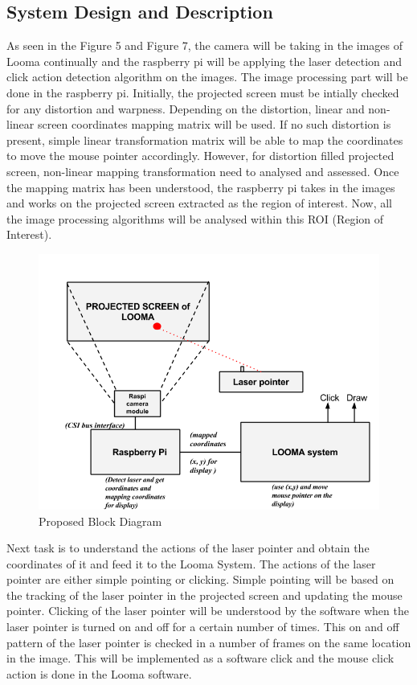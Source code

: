 \documentclass[12pt, a4paper]{article}
\begin{document}
\subsection{System Design and Description}
As seen in the Figure 5 and Figure 7, the camera will be taking in the images of Looma continually and the raspberry pi will be applying the laser detection and click action detection algorithm on the images. The image processing part will be done in the raspberry pi. Initially, the projected screen must be intially checked for any distortion and warpness. Depending on the distortion, linear and non-linear screen coordinates mapping matrix will be used. If no such distortion is present, simple linear transformation matrix will be able to map the coordinates to move the mouse pointer accordingly. However, for distortion filled projected screen, non-linear mapping transformation need to analysed and assessed. Once the mapping matrix has been understood, the raspberry pi takes in the images and works on the projected screen extracted as the region of interest. Now, all the image processing algorithms will be analysed within this ROI (Region of Interest).

\begin{figure}[htp]
\includegraphics[scale=0.5]{proposed_system}
\caption{Proposed Block Diagram}
\label{Proposed Block Diagram}
\end{figure}

Next task is to understand the actions of the laser pointer and obtain the coordinates of it and feed it to the Looma System. The actions of the laser pointer are either simple pointing or clicking. Simple pointing will be based on the tracking of the laser pointer in the projected screen and updating the mouse pointer. Clicking of the laser pointer will be understood by the software when the laser pointer is turned on and off for a certain number of times. This on and off pattern of the laser pointer is checked in a number of frames on the same location in the image. This will be implemented as a software click and the mouse click action is done in the Looma software. 
\end{document}
